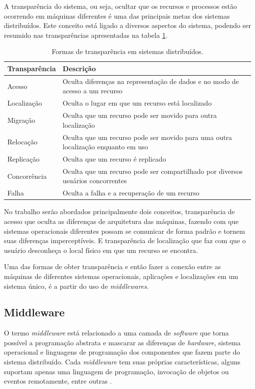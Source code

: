 	A transparência do sistema, ou seja, ocultar que os recursos e processos estão ocorrendo em máquinas diferentes é uma das principais metas dos sistemas distribuídos. Este conceito está ligado a diversos aspectos do sistema, podendo ser resumido nas transparências apresentadas na tabela \ref{transparencia}.
	
	\begin{table}[]
		\caption{Formas de transparência em sistemas distribuídos.}
		\label{transparencia}
		\begin{tabularx}{\linewidth}{|l|m|}
			\hline
			\textbf{Transparência} & \textbf{Descrição} \\ \hline
			Acesso & Oculta diferenças na representação de dados e no modo de acesso a um recurso \\ \hline
			Localização & Oculta o lugar em que um recurso está localizado \\ \hline
			Migração & Oculta que um recurso pode ser movido para outra localização \\ \hline
			Relocação & Oculta que um recurso pode ser movido para uma outra localização enquanto em uso \\ \hline
			Replicação & Oculta que um recurso é replicado \\ \hline
			Concorrência & Oculta que um recurso pode ser compartilhado por diversos usuários concorrentes \\ \hline
			Falha & Oculta a falha e a recuperação de um recurso \\ \hline
		\end{tabularx}
	\end{table}
	
	No trabalho serão abordados principalmente dois conceitos, transparência de acesso que oculta as diferenças de arquitetura das máquinas, fazendo com que sistemas operacionais diferentes possam se comunicar de forma padrão e tornem suas diferenças imperceptíveis. E transparência de localização que faz com que o usuário desconheça o local físico em que um recurso se encontra. 
	
	Uma das formas de obter transparência e então fazer a conexão entre as máquinas de diferentes sistemas operacionais, aplicações e localizações em um sistema único, é a partir do uso de \textit{middlewares}. 
	
	\subsection{Middleware}
	O termo \textit{middleware} está relacionado a uma camada de \textit{software} que torna possível a programação abstrata e mascarar as diferenças de \textit{hardware}, sistema operacional e linguagens de programação dos componentes que fazem parte do sistema distribuído. Cada \textit{middleware} tem suas próprias características, alguns suportam apenas uma linguagem de programação, invocação de objetos ou eventos remotamente, entre outras \cite{Coulouris-2012}.
	
